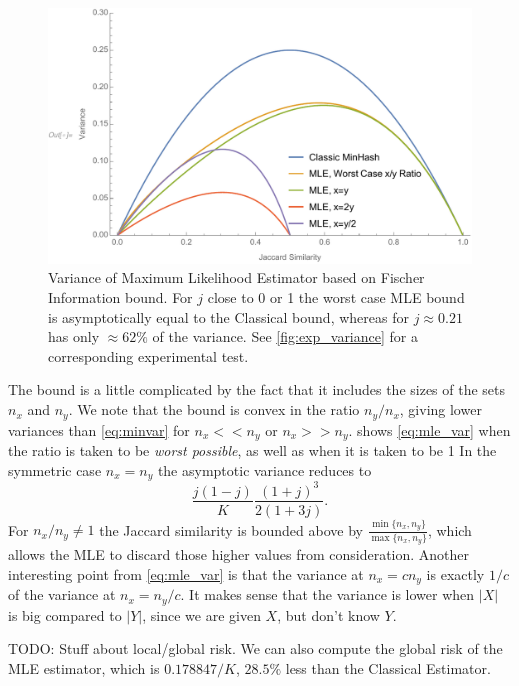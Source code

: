 \begin{figure}
\includegraphics[trim=30 0 0 0,clip,width=\linewidth]{figures/mle_variance2}
\caption{Variance of Maximum Likelihood Estimator based on Fischer Information bound.
For $j$ close to 0 or 1 the worst case MLE bound is asymptotically equal to the Classical bound, whereas for $j\approx 0.21$ has only $\approx 62\%$ of the variance.
See \cref{fig:exp_variance} for a corresponding experimental test.
}
\label{fig:mle_variance}
\end{figure}

The bound is a little complicated by the fact that it includes the sizes of the sets $n_x$ and $n_y$.
We note that the bound is convex in the ratio $n_y/n_x$, giving lower variances than \cref{eq:minvar} for $n_x<\!<n_y$ or $n_x >\!> n_y$.
 shows \cref{eq:mle_var} when the ratio is taken to be \emph{worst possible}, as well as when it is taken to be 1
In the symmetric case $n_x=n_y$ the asymptotic variance reduces to
\[
   \frac{j(1-j)}{K}\frac{(1+j)^3}{2(1+3j)}.
\]
For $n_x/n_y\neq1$ the Jaccard similarity is bounded above by $\frac{\min\{n_x,n_y\}}{\max\{n_x,n_y\}}$, which allows the MLE to discard those higher values from consideration.
Another interesting point from \cref{eq:mle_var} is that the variance at $n_x=c n_y$ is exactly $1/c$ of the variance at $n_x=n_y/c$.
It makes sense that the variance is lower when $|X|$ is big compared to $|Y|$, since we are given $X$, but don't know $Y$.

TODO: Stuff about local/global risk.
We can also compute the global risk of the MLE estimator, which is $0.178847/K$, $28.5\%$ less than the Classical Estimator.

